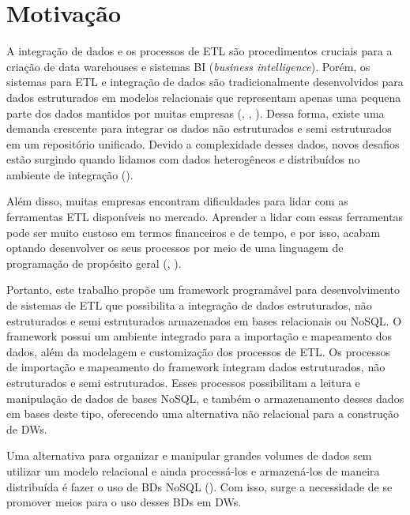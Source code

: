%

\section{Motivação}

A integração de dados e os processos de ETL são procedimentos cruciais para a criação de data warehouses e sistemas BI (\textit{business intelligence}). Porém, os sistemas para ETL e integração de dados são tradicionalmente desenvolvidos para dados estruturados em modelos relacionais que representam apenas uma pequena parte dos dados mantidos por muitas empresas (\cite{darmont:2005}, \cite{russom:2007}, \cite{thomsen:2009}). Dessa forma, existe uma demanda crescente para integrar os dados não estruturados e semi estruturados em um repositório unificado. Devido a complexidade desses dados, novos desafios estão surgindo quando lidamos com dados heterogêneos e distribuídos no ambiente de integração (\cite{salem:2012}).

Além disso, muitas empresas encontram dificuldades para lidar com as ferramentas ETL disponíveis no mercado. Aprender a lidar com essas ferramentas pode ser muito custoso em termos financeiros e de tempo, e por isso, acabam optando desenvolver os seus processos por meio de uma linguagem de programação de propósito geral (\cite{awad:2011}, \cite{munoz:2009}).

Portanto, este trabalho propõe um framework programável para desenvolvimento de sistemas de ETL que possibilita a integração de dados estruturados, não estruturados e semi estruturados armazenados em bases relacionais ou NoSQL. O framework possui um ambiente integrado para a importação e mapeamento dos dados, além da modelagem e customização dos processos de ETL. Os processos de importação e mapeamento do framework integram dados estruturados, não estruturados e semi estruturados. Esses processos possibilitam a leitura e manipulação de dados de bases NoSQL, e também o armazenamento desses dados em bases deste tipo, oferecendo uma alternativa não relacional para a construção de DWs.

Uma alternativa para organizar e manipular grandes volumes de dados sem utilizar um modelo relacional e ainda processá-los e armazená-los de maneira distribuída é fazer o uso de BDs NoSQL (\cite{scabora:2016}). Com isso, surge a necessidade de se promover meios para o uso desses BDs em DWs. 

